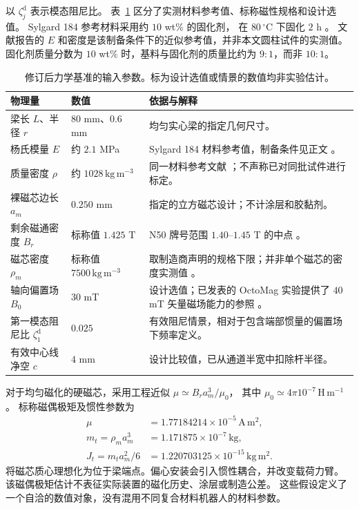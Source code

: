 以 $\zeta_j^{\mathrm{d}}$ 表示模态阻尼比。
表~\ref{mech:parameters} 区分了实测材料参考值、标称磁性规格和设计选值。
Sylgard 184 参考材料采用约 $10$ wt\% 的固化剂，
在 $80\,^{\circ}\mathrm C$ 下固化 $2$ h \citep{cho2021pdms}。
文献报告的 $E$ 和密度是该制备条件下的近似参考值，并非本文圆柱试件的实测值。
固化剂质量分数为 $10$ wt\% 时，基料与固化剂的质量比约为 $9{:}1$，而非 $10{:}1$。

\begin{table}[t]
\centering\small
\caption{修订后力学基准的输入参数。标为设计选值或情景的数值均非实验估计。}
\label{mech:parameters}
\setlength{\tabcolsep}{5pt}
\begin{tabular}{p{}p{}p{}}
\toprule
物理量 & 数值 & 依据与解释\\
\midrule
梁长 $L$、半径 $r$ & $80$ mm、$0.6$ mm & 均匀实心梁的指定几何尺寸。\\
杨氏模量 $E$ & 约 $2.1$ MPa & Sylgard 184 材料参考值，制备条件见正文 \citep{cho2021pdms}。\\
质量密度 $\rho$ & 约 $1028\,\mathrm{kg\,m^{-3}}$ & 同一材料参考文献 \citep{cho2021pdms}；不声称已对同批试件进行标定。\\
裸磁芯边长 $a_m$ & $0.250$ mm & 指定的立方磁芯设计；不计涂层和胶黏剂。\\
剩余磁通密度 $B_r$ & 标称值 $1.425$ T & N50 牌号范围 $1.40$--$1.45$ T 的中点 \citep{smN50}。\\
磁芯密度 $\rho_m$ & 标称值 $7500\,\mathrm{kg\,m^{-3}}$ & 取制造商声明的规格下限；并非单个磁芯的密度实测值 \citep{smN50}。\\
轴向偏置场 $B_0$ & $30$ mT & 设计选值；已发表的 OctoMag 实验提供了 $40$ mT 矢量磁场能力的参照 \citep{lussi2021cvs}。\\
第一模态阻尼比 $\zeta_1^{\mathrm{d}}$ & $0.025$ & 有效阻尼情景，相对于包含端部惯量的偏置场下频率定义。\\
有效中心线净空 $c$ & $4$ mm & 设计比较值，已从通道半宽中扣除杆半径。\\
\bottomrule
\end{tabular}
\end{table}

对于均匀磁化的硬磁芯，采用工程近似 $\mu\simeq B_ra_m^3/\mu_0$，
其中 $\mu_0\simeq4\pi10^{-7}\,\mathrm{H\,m^{-1}}$ \citep{kjMoment}。
标称磁偶极矩及惯性参数为
\begin{align}
 \mu&=1.77184214\times10^{-5}\,\mathrm{A\,m^2},\nonumber\\
 m_t=\rho_ma_m^3&=1.171875\times10^{-7}\,\mathrm{kg},\nonumber\\
 J_t=m_ta_m^2/6&=1.220703125\times10^{-15}\,\mathrm{kg\,m^2}.
 \label{mech:core-properties}
\end{align}
将磁芯质心理想化为位于梁端点。偏心安装会引入惯性耦合，并改变载荷力臂。
该磁偶极矩估计不表征实际装置的磁化历史、涂层或制造公差。
这些假设定义了一个自洽的数值对象，没有混用不同复合材料机器人的材料参数。

